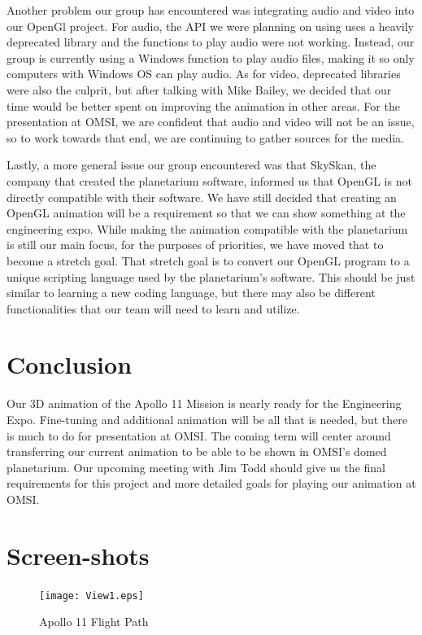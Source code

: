\documentclass[onecolumn, draftclsnofoot,10pt, compsoc]{IEEEtran}
\begin{document}
Another problem our group has encountered was integrating audio and video into our OpenGl project. For audio, the API we were planning on using uses a heavily deprecated library and the functions to play audio were not working. Instead, our group is currently using a Windows function to play audio files, making it so only computers with Windows OS can play audio. As for video, deprecated libraries were also the culprit, but after talking with Mike Bailey, we decided that our time would be better spent on improving the animation in other areas. For the presentation at OMSI, we are confident that audio and video will not be an issue, so to work towards that end, we are continuing to gather sources for the media. 

Lastly, a more general issue our group encountered was that SkySkan, the company that created the planetarium software, informed us that OpenGL is not directly compatible with their software. We have still decided that creating an OpenGL animation will be a requirement so that we can show something at the engineering expo. While making the animation compatible with the planetarium is still our main focus, for the purposes of priorities, we have moved that to become a stretch goal. That stretch goal is to convert our OpenGL program to a unique scripting language used by the planetarium's software. This should be just similar to learning a new coding language, but there may also be different functionalities that our team will need to learn and utilize. 

\section{Conclusion}

Our 3D animation of the Apollo 11 Mission is nearly ready for the Engineering Expo. Fine-tuning and additional animation will be all that is needed, but there is much to do for presentation at OMSI. The coming term will center around transferring our current animation to be able to be shown in OMSI's domed planetarium. Our upcoming meeting with Jim Todd should give us the final requirements for this project and more detailed goals for playing our animation at OMSI. 

\newpage
\section{Screen-shots}

\begin{figure}[!htb]
    \texttt{[image: View1.eps]}
    \centering
    \caption{Apollo 11 Flight Path}

\end{figure}
\end{document}
